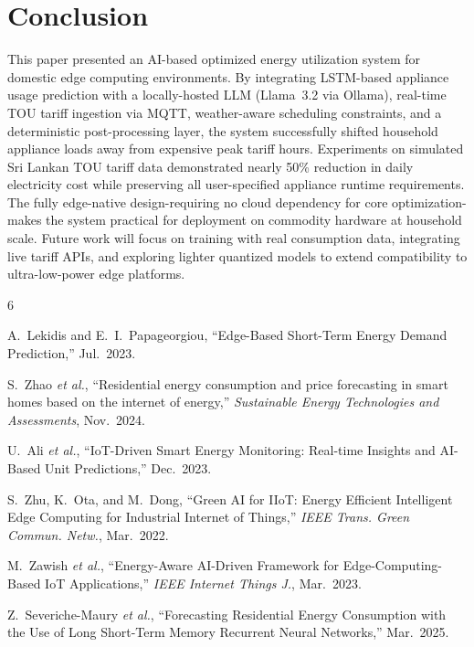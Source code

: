 \documentclass[conference]{IEEEtran}
\begin{document}
\section{Conclusion}
\label{sec:conc}

This paper presented an AI-based optimized energy utilization
system for domestic edge computing environments.
By integrating LSTM-based appliance usage prediction with a
locally-hosted LLM (Llama~3.2 via Ollama), real-time TOU
tariff ingestion via MQTT, weather-aware scheduling constraints,
and a deterministic post-processing layer, the system
successfully shifted household appliance loads away from
expensive peak tariff hours.
Experiments on simulated Sri Lankan TOU tariff data demonstrated
nearly 50\% reduction in daily electricity cost while preserving
all user-specified appliance runtime requirements.
The fully edge-native design-requiring no cloud dependency for
core optimization-makes the system practical for deployment on
commodity hardware at household scale.
Future work will focus on training with real consumption data,
integrating live tariff APIs, and exploring lighter quantized
models to extend compatibility to ultra-low-power edge platforms.

\begin{thebibliography}{6}

A.~Lekidis and E.~I.~Papageorgiou,
``Edge-Based Short-Term Energy Demand Prediction,''
Jul.~2023.

S.~Zhao \textit{et al.},
``Residential energy consumption and price forecasting in smart
homes based on the internet of energy,''
\textit{Sustainable Energy Technologies and Assessments},
Nov.~2024.

U.~Ali \textit{et al.},
``IoT-Driven Smart Energy Monitoring: Real-time Insights and
AI-Based Unit Predictions,''
Dec.~2023.

S.~Zhu, K.~Ota, and M.~Dong,
``Green AI for IIoT: Energy Efficient Intelligent Edge Computing
for Industrial Internet of Things,''
\textit{IEEE Trans. Green Commun. Netw.},
Mar.~2022.

M.~Zawish \textit{et al.},
``Energy-Aware AI-Driven Framework for Edge-Computing-Based
IoT Applications,''
\textit{IEEE Internet Things J.},
Mar.~2023.

Z.~Severiche-Maury \textit{et al.},
``Forecasting Residential Energy Consumption with the Use of
Long Short-Term Memory Recurrent Neural Networks,''
Mar.~2025.

\end{thebibliography}
\end{document}
